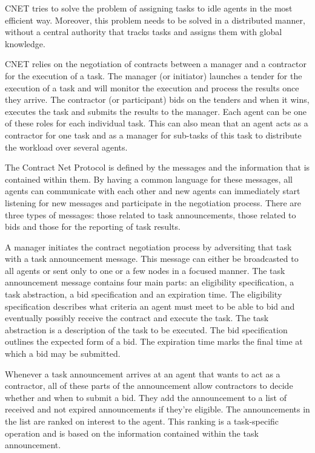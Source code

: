\documentclass[10pt,a4paper]{article}
\begin{document}
CNET tries to solve the problem of assigning tasks to idle agents in the most efficient way. Moreover, this problem needs to be solved in a distributed manner, without a central authority that tracks tasks and assigns them with global knowledge.

CNET relies on the negotiation of contracts between a manager and a contractor for the execution of a task. The manager (or initiator) launches a tender for the execution of a task and will monitor the execution and process the results once they arrive. The contractor (or participant) bids on the tenders and when it wins, executes the task and submits the results to the manager. Each agent can be one of these roles for each individual task. This can also mean that an agent acts as a contractor for one task and as a manager for sub-tasks of this task to distribute the workload over several agents.

The Contract Net Protocol is defined by the messages and the information that is contained within them. By having a common language for these messages, all agents can communicate with each other and new agents can immediately start listening for new messages and participate in the negotiation process. There are three types of messages: those related to task announcements, those related to bids and those for the reporting of task results.

A manager initiates the contract negotiation process by adversiting that task with a task announcement message. This message can either be broadcasted to all agents or sent only to one or a few nodes in a focused manner. The task announcement message contains four main parts: an eligibility specification, a task abstraction, a bid specification and an expiration time. The eligibility specification describes what criteria an agent must meet to be able to bid and eventually possibly receive the contract and execute the task. The task abstraction is a description of the task to be executed. The bid specification outlines the expected form of a bid. The expiration time marks the final time at which a bid may be submitted.

Whenever a task announcement arrives at an agent that wants to act as a contractor, all of these parts of the announcement allow contractors to decide whether and when to submit a bid. They add the announcement to a list of received and not expired announcements if they're eligible. The announcements in the list are ranked on interest to the agent. This ranking is a task-specific operation and is based on the information contained within the task announcement.
\end{document}
